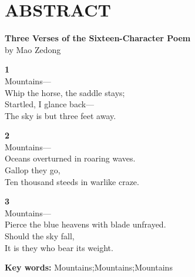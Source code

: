 \chapter*{\fontsize{18}{24}\selectfont \textbf{ABSTRACT}} %
\setmainfont{Times New Roman} %
\begin{spacing}{1.66}
\selectfont

\begin{center}
\Large \textbf{Three Verses of the Sixteen-Character Poem} \\
\large by Mao Zedong
\end{center}

\vspace{1em}

\begin{center}
\textbf{1} \\
Mountains— \\
Whip the horse, the saddle stays; \\
Startled, I glance back— \\
The sky is but three feet away. \\
\end{center}

\vspace{1em}

\begin{center}
\textbf{2} \\
Mountains— \\
Oceans overturned in roaring waves. \\
Gallop they go, \\
Ten thousand steeds in warlike craze. \\
\end{center}

\vspace{1em}

\begin{center}
\textbf{3} \\
Mountains— \\
Pierce the blue heavens with blade unfrayed. \\
Should the sky fall, \\
It is they who bear its weight. \\
\end{center}



\end{spacing}

\textbf{Key words: } Mountains;Mountains;Mountains

\clearpage									%
